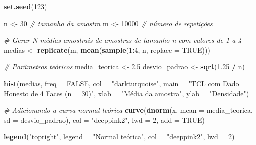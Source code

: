 \documentclass[
]{book}
\newenvironment{Shaded}{\begin{snugshade}}{\end{snugshade}}
\newcommand{\AttributeTok}[1]{\textcolor[rgb]{0.13,0.29,0.53}{#1}}
\newcommand{\CommentTok}[1]{\textcolor[rgb]{0.56,0.35,0.01}{\textit{#1}}}
\newcommand{\ConstantTok}[1]{\textcolor[rgb]{0.56,0.35,0.01}{#1}}
\newcommand{\DecValTok}[1]{\textcolor[rgb]{0.00,0.00,0.81}{#1}}
\newcommand{\FloatTok}[1]{\textcolor[rgb]{0.00,0.00,0.81}{#1}}
\newcommand{\FunctionTok}[1]{\textcolor[rgb]{0.13,0.29,0.53}{\textbf{#1}}}
\newcommand{\NormalTok}[1]{#1}
\newcommand{\OtherTok}[1]{\textcolor[rgb]{0.56,0.35,0.01}{#1}}
\newcommand{\SpecialCharTok}[1]{\textcolor[rgb]{0.81,0.36,0.00}{\textbf{#1}}}
\newcommand{\StringTok}[1]{\textcolor[rgb]{0.31,0.60,0.02}{#1}}
\begin{document}
\begin{Shaded}
\begin{Highlighting}[]
\FunctionTok{set.seed}\NormalTok{(}\DecValTok{123}\NormalTok{)}

\NormalTok{n }\OtherTok{\textless{}{-}} \DecValTok{30}      \CommentTok{\# tamanho da amostra}
\NormalTok{m }\OtherTok{\textless{}{-}} \DecValTok{10000}   \CommentTok{\# número de repetições}

\CommentTok{\# Gerar N médias amostrais de amostras de tamanho n com valores de 1 a 4}
\NormalTok{medias }\OtherTok{\textless{}{-}} \FunctionTok{replicate}\NormalTok{(m, }\FunctionTok{mean}\NormalTok{(}\FunctionTok{sample}\NormalTok{(}\DecValTok{1}\SpecialCharTok{:}\DecValTok{4}\NormalTok{, n, }\AttributeTok{replace =} \ConstantTok{TRUE}\NormalTok{)))}

\CommentTok{\# Parâmetros teóricos}
\NormalTok{media\_teorica }\OtherTok{\textless{}{-}} \FloatTok{2.5}
\NormalTok{desvio\_padrao }\OtherTok{\textless{}{-}} \FunctionTok{sqrt}\NormalTok{(}\FloatTok{1.25} \SpecialCharTok{/}\NormalTok{ n)}

\FunctionTok{hist}\NormalTok{(medias, }\AttributeTok{freq =} \ConstantTok{FALSE}\NormalTok{, }\AttributeTok{col =} \StringTok{"darkturquoise"}\NormalTok{,}
     \AttributeTok{main =} \StringTok{"TCL com Dado Honesto de 4 Faces (n = 30)"}\NormalTok{,}
     \AttributeTok{xlab =} \StringTok{"Média da amostra"}\NormalTok{, }\AttributeTok{ylab =} \StringTok{"Densidade"}\NormalTok{)}

\CommentTok{\# Adicionando a curva normal teórica}
\FunctionTok{curve}\NormalTok{(}\FunctionTok{dnorm}\NormalTok{(x, }\AttributeTok{mean =}\NormalTok{ media\_teorica, }\AttributeTok{sd =}\NormalTok{ desvio\_padrao),}
      \AttributeTok{col =} \StringTok{"deeppink2"}\NormalTok{, }\AttributeTok{lwd =} \DecValTok{2}\NormalTok{, }\AttributeTok{add =} \ConstantTok{TRUE}\NormalTok{)}

\FunctionTok{legend}\NormalTok{(}\StringTok{"topright"}\NormalTok{, }\AttributeTok{legend =} \StringTok{"Normal teórica"}\NormalTok{, }\AttributeTok{col =} \StringTok{"deeppink2"}\NormalTok{, }\AttributeTok{lwd =} \DecValTok{2}\NormalTok{)}
\end{Highlighting}
\end{Shaded}
\end{document}
